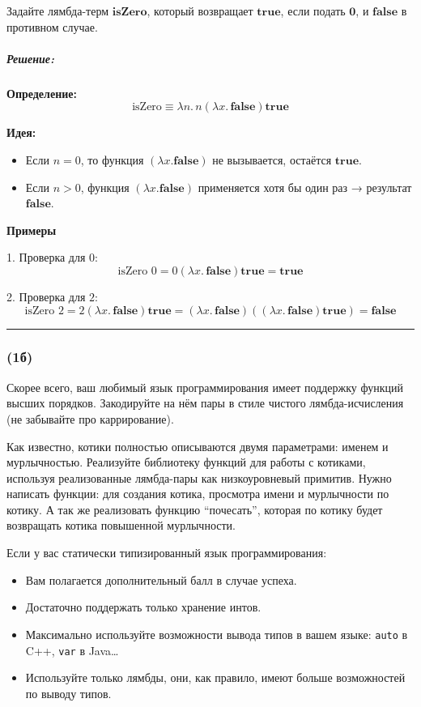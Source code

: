 \documentclass{article}
\newenvironment{proof}{\subparagraph{\hspace{-1em}Решение:\newline}}{\par\noindent\rule{\textwidth}{0.4pt}}
\newcommand{\term}[1]{\mathbf{#1}}
\begin{document}
    Задайте лямбда-терм $\term{isZero}$, который возвращает $\term{true}$, если подать $\term{0}$, и $\term{false}$ в противном случае.

    \begin{proof}

        \textbf{Определение:}
        \[
            \text{isZero} \equiv \lambda n.\, n (\lambda x.\, \mathbf{false}) \mathbf{true}
        \]

        \textbf{Идея:}
        \begin{itemize}
            \item Если $n = 0$, то функция $(\lambda x. \mathbf{false})$ не вызывается, остаётся $\mathbf{true}$.
            \item Если $n > 0$, функция $(\lambda x. \mathbf{false})$ применяется хотя бы один раз → результат $\mathbf{false}$.
        \end{itemize}

        \textbf{Примеры}

        1. Проверка для $0$:
        \[
            \text{isZero } 0
            = 0 (\lambda x.\, \mathbf{false}) \mathbf{true}
            = \mathbf{true}
        \]

        2. Проверка для $2$:
        \[
            \text{isZero } 2
            = 2 (\lambda x.\, \mathbf{false}) \mathbf{true}
            = (\lambda x.\, \mathbf{false}) ((\lambda x.\, \mathbf{false}) \mathbf{true})
            = \mathbf{false}
        \]

    \end{proof}

    \subsubsection{(1б)}

    Скорее всего, ваш любимый язык программирования имеет поддержку функций высших порядков.
    Закодируйте на нём пары в стиле чистого лямбда-исчисления (не забывайте про каррирование).

    Как известно, котики полностью описываются двумя параметрами: именем и мурлычностью.
    Реализуйте библиотеку функций для работы с котиками, используя реализованные лямбда-пары как низкоуровневый примитив.
    Нужно написать функции: для создания котика, просмотра имени и мурлычности по котику.
    А так же реализовать функцию ``почесать'', которая по котику будет возвращать котика повышенной мурлычности.

    Если у вас статически типизированный язык программирования:
    \begin{itemize}
        \item Вам полагается дополнительный балл в случае успеха.
        \item Достаточно поддержать только хранение интов.
        \item Максимально используйте возможности вывода типов в вашем языке: \texttt{auto} в C++, \texttt{var} в Java\ldots
        \item Используйте только лямбды, они, как правило, имеют больше возможностей по выводу типов.
    \end{itemize}
\end{document}

